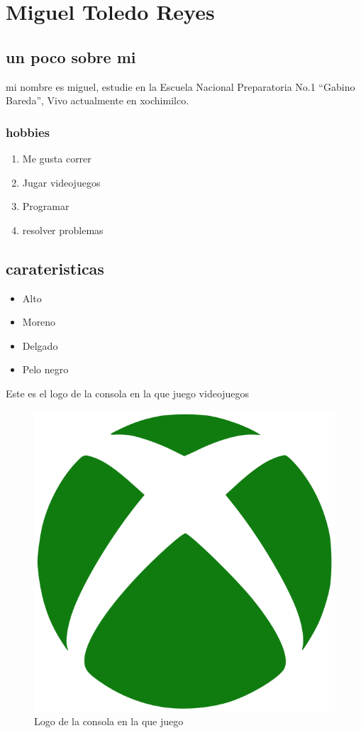 \chapter{Miguel Toledo Reyes}


\section{un poco sobre mi}
 mi nombre es miguel, estudie en la Escuela Nacional Preparatoria No.1 ``Gabino Bareda'', Vivo actualmente en xochimilco.

\subsection{hobbies}
\begin{enumerate}
\item   Me gusta correr
\item   Jugar videojuegos
\item   Programar
\item   resolver problemas
 \end{enumerate}


\section{ carateristicas}
\begin{itemize}
\item    Alto
\item   Moreno
\item   Delgado
\item  Pelo negro
\end{itemize}
  Este es el logo de la consola en la que juego videojuegos\\
  
  \begin{figure}[h]
  \centering
  \includegraphics[scale=.5]{IMG/15.png}
  \caption{Logo de la consola en la que juego}
  \label{fig:Logo de xbox}
  \end{figure}



